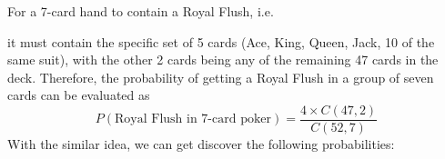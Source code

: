 \documentclass{article}
\begin{document}
For a 7-card hand to contain a Royal Flush, i.e.
\begin{center}
\end{center}
it must contain the specific 
set of 5 cards (Ace, King, Queen, Jack, 10 of the same suit), with the 
other 2 cards being any of the remaining 47 cards in the deck. Therefore, 
the probability of getting a Royal Flush in a group of seven cards can 
be evaluated as 
\[
P(\text{Royal Flush in 7-card poker}) = \frac{4 \times C(47, 2)}{C(52, 7)}
\]
With the similar idea, we can get discover the following probabilities:
\begin{table}[ht]
    \centering
    \caption{Probabilities of Being Dealt Specific Hands in Texas Hold'em Poker}
    \label{tab:poker_hands}
\end{table}
\end{document}
